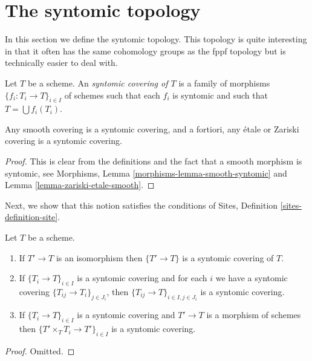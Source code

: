 \section{The syntomic topology}
\label{section-syntomic}

\noindent
In this section we define the syntomic topology.
This topology is quite interesting in that it often
has the same cohomology groups as the fppf topology
but is technically easier to deal with.

\begin{definition}
\label{definition-syntomic-covering}
Let $T$ be a scheme. An {\it syntomic covering of $T$} is a family
of morphisms $\{f_i : T_i \to T\}_{i \in I}$ of schemes
such that each $f_i$ is syntomic and such
that $T = \bigcup f_i(T_i)$.
\end{definition}

\begin{lemma}
\label{lemma-zariski-etale-smooth-syntomic}
Any smooth covering is a syntomic covering, and a fortiori,
any \'etale or Zariski covering is a syntomic covering.
\end{lemma}

\begin{proof}
This is clear from the definitions and the fact that a smooth
morphism is syntomic, see
Morphisms, Lemma \ref{morphisms-lemma-smooth-syntomic}
and Lemma \ref{lemma-zariski-etale-smooth}.
\end{proof}

\noindent
Next, we show that this notion satisfies the conditions of
Sites, Definition \ref{sites-definition-site}.

\begin{lemma}
\label{lemma-syntomic}
Let $T$ be a scheme.
\begin{enumerate}
\item If $T' \to T$ is an isomorphism then $\{T' \to T\}$
is a syntomic covering of $T$.
\item If $\{T_i \to T\}_{i\in I}$ is a syntomic covering and for each
$i$ we have a syntomic covering $\{T_{ij} \to T_i\}_{j\in J_i}$, then
$\{T_{ij} \to T\}_{i \in I, j\in J_i}$ is a syntomic covering.
\item If $\{T_i \to T\}_{i\in I}$ is a syntomic covering
and $T' \to T$ is a morphism of schemes then
$\{T' \times_T T_i \to T'\}_{i\in I}$ is a syntomic covering.
\end{enumerate}
\end{lemma}

\begin{proof}
Omitted.
\end{proof}

